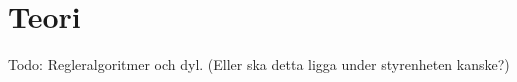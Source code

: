 %


\section{Teori}

Todo: Regleralgoritmer och dyl. (Eller ska detta ligga under styrenheten kanske?)



